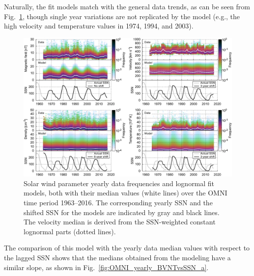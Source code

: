 \documentclass[]{aa}
\begin{document}
        Naturally, the fit models match with the general data trends, as can be seen from Fig.~\ref{fig:OMNI_yearly_BVdblNTSSN_fit_e_plot}, though single year variations are not replicated by the model (e.g., the high velocity and temperature values in 1974, 1994, and 2003).
        \begin{figure}
                \includegraphics[width=18cm]{OMNI_yearly_BVdblNTSSN_fit_e_plot.pdf}
                \caption{Solar wind parameter yearly data frequencies and lognormal fit models, both with their median values (white lines) over the OMNI time period 1963--2016. The corresponding yearly SSN and the shifted SSN for the models are indicated by gray and black lines. The velocity median is derived from the SSN-weighted constant lognormal parts (dotted lines).}
                \label{fig:OMNI_yearly_BVdblNTSSN_fit_e_plot}
        \end{figure}
        The comparison of this model with the yearly data median values with respect to the lagged SSN shows that the medians obtained from the modeling have a similar slope, as shown in Fig.~\ref{fig:OMNI_yearly_BVNTvsSSN_a}.
\end{document}
